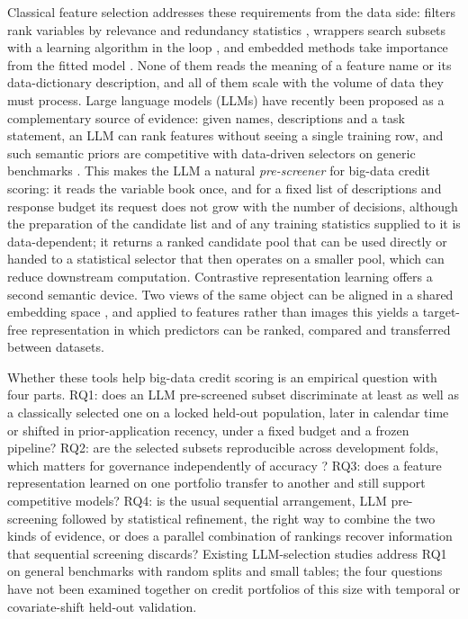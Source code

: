 \documentclass[final,5p,twocolumn]{elsarticle}
\begin{document}
Classical feature selection addresses these requirements from the data side: filters rank variables by relevance and redundancy statistics \cite{guyon2003,peng2005}, wrappers search subsets with a learning algorithm in the loop \cite{kohavi1997,guyon2002,kursa2010}, and embedded methods take importance from the fitted model \cite{tibshirani1996,lundberg2017}. None of them reads the meaning of a feature name or its data-dictionary description, and all of them scale with the volume of data they must process. Large language models (LLMs) have recently been proposed as a complementary source of evidence: given names, descriptions and a task statement, an LLM can rank features without seeing a single training row, and such semantic priors are competitive with data-driven selectors on generic benchmarks \cite{choi2022,jeong2025,li2025sigkdd,zhang2025llmlasso}. This makes the LLM a natural \emph{pre-screener} for big-data credit scoring: it reads the variable book once, and for a fixed list of descriptions and response budget its request does not grow with the number of decisions, although the preparation of the candidate list and of any training statistics supplied to it is data-dependent; it returns a ranked candidate pool that can be used directly or handed to a statistical selector that then operates on a smaller pool, which can reduce downstream computation. Contrastive representation learning offers a second semantic device. Two views of the same object can be aligned in a shared embedding space \cite{radford2021,oord2018}, and applied to features rather than images this yields a target-free representation in which predictors can be ranked, compared and transferred between datasets.

Whether these tools help big-data credit scoring is an empirical question with four parts. RQ1: does an LLM pre-screened subset discriminate at least as well as a classically selected one on a locked held-out population, later in calendar time or shifted in prior-application recency, under a fixed budget and a frozen pipeline? RQ2: are the selected subsets reproducible across development folds, which matters for governance independently of accuracy \cite{kalousis2007,nogueira2018}? RQ3: does a feature representation learned on one portfolio transfer to another and still support competitive models? RQ4: is the usual sequential arrangement, LLM pre-screening followed by statistical refinement, the right way to combine the two kinds of evidence, or does a parallel combination of rankings recover information that sequential screening discards? Existing LLM-selection studies address RQ1 on general benchmarks with random splits and small tables; the four questions have not been examined together on credit portfolios of this size with temporal or covariate-shift held-out validation.
\end{document}
